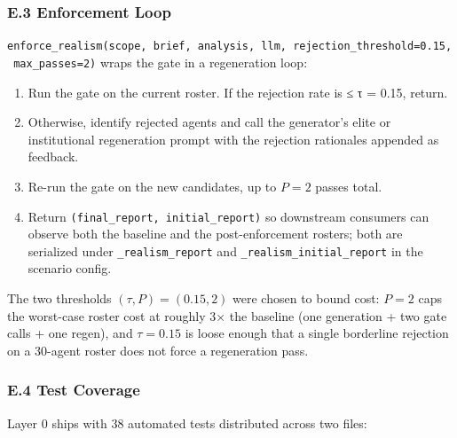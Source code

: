 \documentclass[
]{article}
\providecommand{\tightlist}{%
  \setlength{\itemsep}{0pt}\setlength{\parskip}{0pt}}
\begin{document}
\subsubsection{E.3 Enforcement Loop}\label{e.3-enforcement-loop}

\texttt{enforce\_realism(scope,\ brief,\ analysis,\ llm,\ rejection\_threshold=0.15,\ max\_passes=2)}
wraps the gate in a regeneration loop:

\begin{enumerate}
\def\labelenumi{\arabic{enumi}.}
\tightlist
\item
  Run the gate on the current roster. If the rejection rate is ≤ τ =
  0.15, return.
\item
  Otherwise, identify rejected agents and call the generator's elite or
  institutional regeneration prompt with the rejection rationales
  appended as feedback.
\item
  Re-run the gate on the new candidates, up to \(P = 2\) passes total.
\item
  Return \texttt{(final\_report,\ initial\_report)} so downstream
  consumers can observe both the baseline and the post-enforcement
  rosters; both are serialized under \texttt{\_realism\_report} and
  \texttt{\_realism\_initial\_report} in the scenario config.
\end{enumerate}

The two thresholds \((\tau, P) = (0.15, 2)\) were chosen to bound cost:
\(P = 2\) caps the worst-case roster cost at roughly 3× the baseline
(one generation + two gate calls + one regen), and \(\tau = 0.15\) is
loose enough that a single borderline rejection on a 30-agent roster
does not force a regeneration pass.

\subsubsection{E.4 Test Coverage}\label{e.4-test-coverage}

Layer 0 ships with 38 automated tests distributed across two files:
\end{document}
